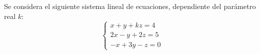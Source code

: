 \documentclass[addpoints,spanish, 12pt,a4paper]{exam}
\begin{document}
\begin{questions}
\question Se considera el siguiente sistema lineal de ecuaciones, dependiente del par\'ametro real $k$:
\begin{equation*}
\begin{cases}
    x + y + kz = 4 \\
    2x - y + 2z = 5 \\
    -x + 3y - z = 0
\end{cases}
\end{equation*}

\end{questions}
\end{document}
